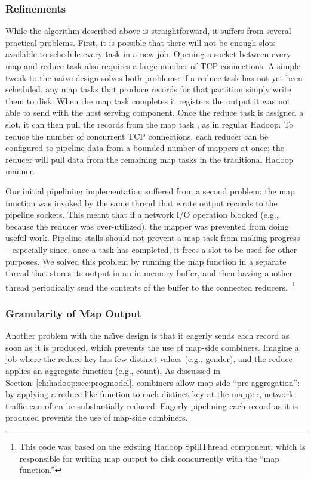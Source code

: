 \subsubsection{Refinements}
\label{ch:hop:sec:pipe-refine}

While the algorithm described above is straightforward, it suffers from several
practical problems.  First, it is possible that there will not be enough slots
available to schedule every task in a new job.  Opening a socket between every
map and reduce task also requires a large number of TCP connections.  A simple
tweak to the na\"{\i}ve design solves both problems: if a reduce task has not
yet been scheduled, any map tasks that produce records for that partition
simply write them to disk.  When the map task completes it registers the output
it was not able to send with the host \TT serving component.  Once the reduce
task is assigned a slot, it can then pull the records from the map task \TT, as
in regular Hadoop.  To reduce the number of concurrent TCP connections, each
reducer can be configured to pipeline data from a bounded number of mappers at
once; the reducer will pull data from the remaining map tasks in the
traditional Hadoop manner.

Our initial pipelining implementation suffered from a second problem: the map
function was invoked by the same thread that wrote output records to the
pipeline sockets.  This meant that if a network I/O operation blocked (e.g.,
because the reducer was over-utilized), the mapper was prevented from doing
useful work.  Pipeline stalls should not prevent a map task from making
progress -- especially since, once a task has completed, it frees a {\TT} slot
to be used for other purposes.  We solved this problem by running the map
function in a separate thread that stores its output in an in-memory buffer,
and then having another thread periodically send the contents of the buffer to
the connected reducers.~\footnote{This code was based on the existing Hadoop
SpillThread component, which is responsible for writing map output to disk
concurrently with the ``map function.''}

\subsubsection{Granularity of Map Output}
\label{ch:hop:sec:mapout}

Another problem with the na\"{\i}ve design is that it eagerly sends each record
as soon as it is produced, which prevents the use of map-side combiners.
Imagine a job where the reduce key has few distinct values (e.g., gender), and
the reduce applies an aggregate function (e.g., count).  As discussed in
Section~\ref{ch:hadoop:sec:progmodel}, combiners allow map-side
``pre-aggregation'': by applying a reduce-like function to each distinct key at
the mapper, network traffic can often be substantially reduced.  Eagerly
pipelining each record as it is produced prevents the use of map-side
combiners.

